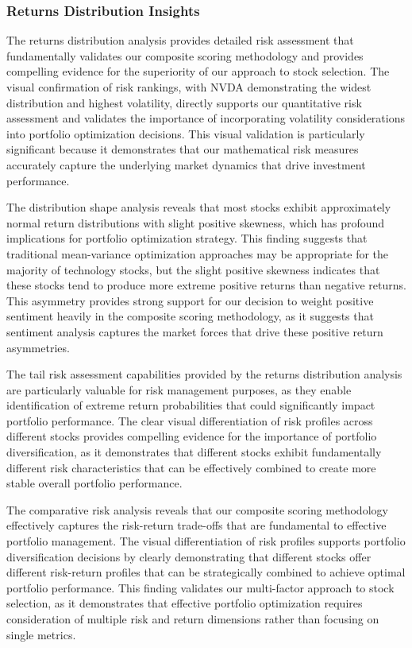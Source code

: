 \documentclass[12pt,a4paper]{article}
\begin{document}
\subsubsection{Returns Distribution Insights}
The returns distribution analysis provides detailed risk assessment that fundamentally validates our composite scoring methodology and provides compelling evidence for the superiority of our approach to stock selection. The visual confirmation of risk rankings, with NVDA demonstrating the widest distribution and highest volatility, directly supports our quantitative risk assessment and validates the importance of incorporating volatility considerations into portfolio optimization decisions. This visual validation is particularly significant because it demonstrates that our mathematical risk measures accurately capture the underlying market dynamics that drive investment performance.

The distribution shape analysis reveals that most stocks exhibit approximately normal return distributions with slight positive skewness, which has profound implications for portfolio optimization strategy. This finding suggests that traditional mean-variance optimization approaches may be appropriate for the majority of technology stocks, but the slight positive skewness indicates that these stocks tend to produce more extreme positive returns than negative returns. This asymmetry provides strong support for our decision to weight positive sentiment heavily in the composite scoring methodology, as it suggests that sentiment analysis captures the market forces that drive these positive return asymmetries.

The tail risk assessment capabilities provided by the returns distribution analysis are particularly valuable for risk management purposes, as they enable identification of extreme return probabilities that could significantly impact portfolio performance. The clear visual differentiation of risk profiles across different stocks provides compelling evidence for the importance of portfolio diversification, as it demonstrates that different stocks exhibit fundamentally different risk characteristics that can be effectively combined to create more stable overall portfolio performance.

The comparative risk analysis reveals that our composite scoring methodology effectively captures the risk-return trade-offs that are fundamental to effective portfolio management. The visual differentiation of risk profiles supports portfolio diversification decisions by clearly demonstrating that different stocks offer different risk-return profiles that can be strategically combined to achieve optimal portfolio performance. This finding validates our multi-factor approach to stock selection, as it demonstrates that effective portfolio optimization requires consideration of multiple risk and return dimensions rather than focusing on single metrics.
\end{document}
